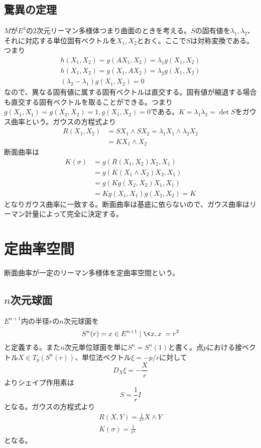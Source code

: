 \subsection{驚異の定理}
    $M$が$E^3$の2次元リーマン多様体つまり曲面のときを考える。$S$の固有値を$\lambda_1, \lambda_2$、それに対応する単位固有ベクトルを$X_1, X_2$とおく。ここで$S$は対称変換である。つまり
    \begin{gather*}
        h(X_1, X_2) = g(AX_1, X_2) = \lambda_1g(X_1, X_2)\\
        h(X_1, X_2) = g(X_1, AX_2) = \lambda_2g(X_1, X_2)\\
        (\lambda_2 - \lambda_1)g(X_1, X_2) = 0
    \end{gather*}
    なので、異なる固有値に属する固有ベクトルは直交する。固有値が縮退する場合も直交する固有ベクトルを取ることができる。つまり$g(X_1, X_1) = g(X_2, X_2) = 1, g(X_1, X_2) = 0$である。$K = \lambda_1\lambda_2 = \det S$をガウス曲率という。ガウスの方程式より
    \begin{align*}
        R(X_1, X_2)
            &= SX_1 \wedge SX_2 = \lambda_1X_1 \wedge \lambda_2X_2\\
            &= KX_1 \wedge X_2
    \end{align*}
    断面曲率は
    \begin{align*}
        K(\sigma)
            &= g(R(X_1, X_2)X_2, X_1)\\
            &= g(K(X_1 \wedge X_2)X_2, X_1)\\
            &= g(Kg(X_2, X_2)X_1, X_1)\\
            &= Kg(X_1, X_1)g(X_2, X_2) = K
    \end{align*}
    となりガウス曲率に一致する。断面曲率は基底に依らないので、ガウス曲率はリーマン計量によって完全に決定する。

\section{定曲率空間}
断面曲率が一定のリーマン多様体を定曲率空間という。

\subsection{$n$次元球面}
    $E^{n+1}$内の半径$r$の$n$次元球面を
        \[S^n(r) = {x \in E^{n+1} \mid \<x, x\> = r^2}\]
    と定義する。また$n$次元単位球面を単に$S^n = S^n(1)$と書く。点$p$における接ベクトル$X \in T_p(S^n(r))$、単位法ベクトル$\xi = -p/r$に対して
        \[D_X\xi = -\frac{X}{r}\]
    よりシェイプ作用素は
        \[S = \frac{1}{r}I\]
    となる。ガウスの方程式より
    \begin{align*}
        R(X, Y) = \frac{1}{r^2}X \wedge Y\\
        K(\sigma) = \frac{1}{r^2}
    \end{align*}
    となる。

